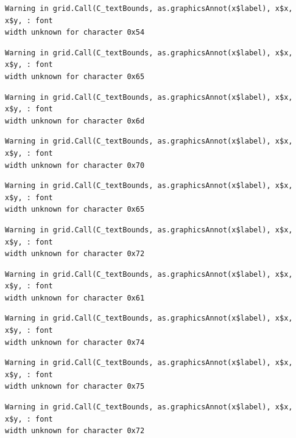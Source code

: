 \documentclass[
  letterpaper,
  DIV=11,
  numbers=noendperiod]{scrreprt}
\begin{document}
\begin{verbatim}
Warning in grid.Call(C_textBounds, as.graphicsAnnot(x$label), x$x, x$y, : font
width unknown for character 0x54
\end{verbatim}

\begin{verbatim}
Warning in grid.Call(C_textBounds, as.graphicsAnnot(x$label), x$x, x$y, : font
width unknown for character 0x65
\end{verbatim}

\begin{verbatim}
Warning in grid.Call(C_textBounds, as.graphicsAnnot(x$label), x$x, x$y, : font
width unknown for character 0x6d
\end{verbatim}

\begin{verbatim}
Warning in grid.Call(C_textBounds, as.graphicsAnnot(x$label), x$x, x$y, : font
width unknown for character 0x70
\end{verbatim}

\begin{verbatim}
Warning in grid.Call(C_textBounds, as.graphicsAnnot(x$label), x$x, x$y, : font
width unknown for character 0x65
\end{verbatim}

\begin{verbatim}
Warning in grid.Call(C_textBounds, as.graphicsAnnot(x$label), x$x, x$y, : font
width unknown for character 0x72
\end{verbatim}

\begin{verbatim}
Warning in grid.Call(C_textBounds, as.graphicsAnnot(x$label), x$x, x$y, : font
width unknown for character 0x61
\end{verbatim}

\begin{verbatim}
Warning in grid.Call(C_textBounds, as.graphicsAnnot(x$label), x$x, x$y, : font
width unknown for character 0x74
\end{verbatim}

\begin{verbatim}
Warning in grid.Call(C_textBounds, as.graphicsAnnot(x$label), x$x, x$y, : font
width unknown for character 0x75
\end{verbatim}

\begin{verbatim}
Warning in grid.Call(C_textBounds, as.graphicsAnnot(x$label), x$x, x$y, : font
width unknown for character 0x72
\end{verbatim}
\end{document}
